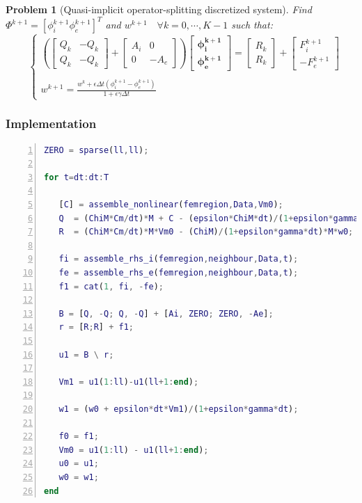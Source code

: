 \documentclass[a4paper,11pt]{article}
\newtheorem{problem}{Problem}
\begin{document}
\begin{problem} [Quasi-implicit operator-splitting discretized system]
Find $\Phi^{k+1}=[\phi_i^{k+1} \phi_e^{k+1}]^T$ and $w^{k+1} \quad \forall k=0, \cdots, K-1$ such that:
\begin{equation*}
\quad
\begin{cases}
\left(
\begin{bmatrix} Q_k & -Q_k \\ Q_k & -Q_k \end{bmatrix} + 
\begin{bmatrix} A_i & 0 \\ 0 & -A_e\end{bmatrix}
\right)
\begin{bmatrix}
\bm{\phi_i^{k+1}} \\ \bm{\phi_e^{k+1}}
\end{bmatrix}
= \begin{bmatrix} R_k \\ R_k \end{bmatrix} + \begin{bmatrix} F_i^{k+1} \\  -F_e^{k+1}\end{bmatrix} \\ \\
w^{k+1} = \frac{\displaystyle w^k + \epsilon \Delta t (\phi_i^{k+1}-\phi_e^{k+1})}{\displaystyle 1+\epsilon \gamma \Delta t}
\end{cases}
\end{equation*}
\end{problem}
\vspace{4mm}
\subsubsection{Implementation}
\begin{lstlisting}[language=Matlab,basicstyle=\small, numbers=left, numberstyle=\tiny,  name = main2D.m (quasi-implicit operator-splitting), frame=single]
ZERO = sparse(ll,ll);
        
for t=dt:dt:T
        
   [C] = assemble_nonlinear(femregion,Data,Vm0);
   Q  = (ChiM*Cm/dt)*M + C - (epsilon*ChiM*dt)/(1+epsilon*gamma*dt)*M;
   R  = (ChiM*Cm/dt)*M*Vm0 - (ChiM)/(1+epsilon*gamma*dt)*M*w0;
    
   fi = assemble_rhs_i(femregion,neighbour,Data,t);
   fe = assemble_rhs_e(femregion,neighbour,Data,t);
   f1 = cat(1, fi, -fe);
    
   B = [Q, -Q; Q, -Q] + [Ai, ZERO; ZERO, -Ae];
   r = [R;R] + f1;
        
   u1 = B \ r; 
        
   Vm1 = u1(1:ll)-u1(ll+1:end);

   w1 = (w0 + epsilon*dt*Vm1)/(1+epsilon*gamma*dt);
    
   f0 = f1;
   Vm0 = u1(1:ll) - u1(ll+1:end);
   u0 = u1;
   w0 = w1;
end
\end{lstlisting}
\end{document}
